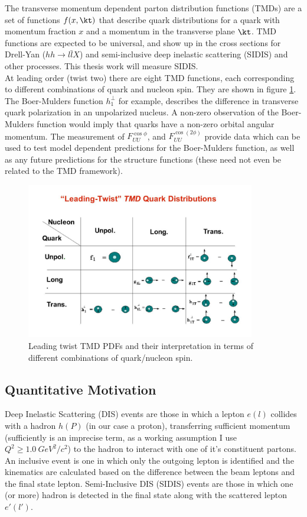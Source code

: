 The transverse momentum dependent parton distribution functions (TMDs) are a set of functions $f(x,\kt)$ that describe quark distributions for a quark with momentum fraction $x$ and a momentum in the transverse plane $\kt$.  TMD functions are expected to be universal, and show up in the cross sections for Drell-Yan ($hh \rightarrow l \bar{l}X$) and semi-inclusive deep inelastic scattering (SIDIS) and other processes.  This thesis work will measure SIDIS.  \\

At leading order (twist two) there are eight TMD functions, each corresponding to different combinations of quark and nucleon spin.  They are shown in figure \ref{fig:tmd-table}.  The Boer-Mulders function $h_{1}^{\perp}$ for example, describes the difference in transverse quark polarization in an unpolarized nucleus.  A non-zero observation of the Boer-Mulders function would imply that quarks have a non-zero orbital angular momentum.  The measurement of $F_{UU}^{\cos\phi}$, and $F_{UU}^{\cos(2\phi)}$ provide data which can be used to test model dependent predictions for the Boer-Mulders function, as well as any future predictions for the structure functions (these need not even be related to the TMD framework).  

\begin{figure}
  \centering
  \includegraphics[width=10cm]{image/TMD-table.jpg}
  \caption{Leading twist TMD PDFs and their interpretation in terms of different combinations of quark/nucleon spin.}
  \label{fig:tmd-table}
\end{figure}

\subsection{Quantitative Motivation}

Deep Inelastic Scattering (DIS) events are those in which a lepton $e(l)$ collides with a hadron $h(P)$ (in our case a proton), transferring sufficient momentum (sufficiently is an imprecise term, as a working assumption I use $Q^{2} \geq 1.0 \: GeV^{2}/c^{2}$) to the hadron to interact with one of it's constituent partons.  An inclusive event is one in which only the outgoing lepton is identified and the kinematics are calculated based on the difference between the beam leptons and the final state lepton.  Semi-Inclusive DIS (SIDIS) events are those in which one (or more) hadron is detected in the final state along with the scattered lepton $e'(l')$.  


